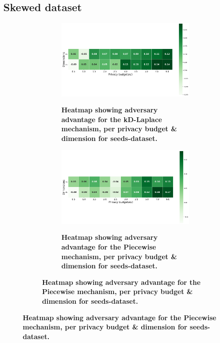 {\subsection{Skewed dataset}
\begin{figure}[H]
  \centering
  \begin{subfigure}[b]{0.85\textwidth}
    \begin{subfigure}[c]{1\textwidth}
      \caption{\textbf{Heatmap showing adversary advantage for the kD-Laplace mechanism, per privacy budget \& dimension for seeds-dataset.}}
      \includegraphics[width=1\textwidth]{Results/nd-laplace/nd-Laplace/skewed-dataset/shokri_mi_adv.png}
      \label{fig:privacy_skewed-dataset_adversial_advantage_kd-laplace}
    \end{subfigure}
    \vfill %

    \begin{subfigure}[c]{1\textwidth}
      \caption{\textbf{Heatmap showing adversary advantage for the Piecewise mechanism, per privacy budget \& dimension for seeds-dataset.}}
      \includegraphics[width=1\textwidth]{Results/nd-laplace/piecewise/skewed-dataset/shokri_mi_adv.png}
      \label{fig:privacy_skewed-dataset_adversial_advantage_piecewise}
    \end{subfigure}
  \end{subfigure}
\end{figure}
\newpage
}
